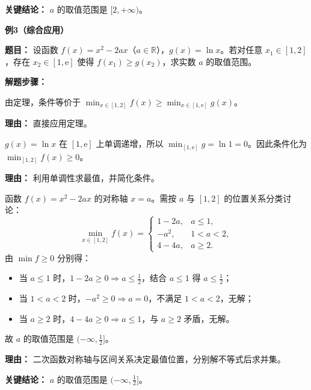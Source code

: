 \begin{examplebox}
	\textbf{\textcolor{CExample}{关键结论：}}
	$a$ 的取值范围是 $[2,+\infty)$。

	\medskip
	\textbf{\textcolor{CExample}{例3（综合应用）}}

	\textbf{\textcolor{CExample}{题目：}}
	设函数 $f(x)=x^2-2ax$（$a\in\mathbb{R}$），$g(x)=\ln x$。若对任意 $x_1\in[1,2]$，存在 $x_2\in[1,\mathrm{e}]$ 使得 $f(x_1)\ge g(x_2)$，求实数 $a$ 的取值范围。

	\textbf{\textcolor{CExample}{解题步骤：}}
	\begin{description}[style=nextline, leftmargin=2.8em, labelsep=0.5em, itemsep=0.45em]
		\item[\textbf{第一步（转化条件）：}] 由定理，条件等价于 $\displaystyle\min_{x\in[1,2]} f(x) \ge \min_{x\in[1,\mathrm{e}]} g(x)$。
			\par\textbf{理由：} 直接应用定理。

		\item[\textbf{第二步（求$g$最小值）：}] $g(x)=\ln x$ 在 $[1,\mathrm{e}]$ 上单调递增，所以 $\min_{[1,\mathrm{e}]} g = \ln 1 = 0$。因此条件化为 $\min_{[1,2]} f(x) \ge 0$。
			\par\textbf{理由：} 利用单调性求最值，并简化条件。

		\item[\textbf{第三步（分类求$f$最小值并解）：}] 函数 $f(x)=x^2-2ax$ 的对称轴 $x=a$。需按 $a$ 与 $[1,2]$ 的位置关系分类讨论：
			\[
				\min_{x\in[1,2]} f(x) =
				\begin{cases}
					1-2a, & a\le1,\\
					-a^2, & 1<a<2,\\
					4-4a, & a\ge2.
			\end{cases}
			\]
			由 $\min f\ge0$ 分别得：
			\begin{itemize}[leftmargin=1.5em]
			\item 当 $a\le1$ 时，$1-2a\ge0 \Rightarrow a\le\frac12$，结合 $a\le1$ 得 $a\le\frac12$；
			\item 当 $1<a<2$ 时，$-a^2\ge0 \Rightarrow a=0$，不满足 $1<a<2$，无解；
			\item 当 $a\ge2$ 时，$4-4a\ge0 \Rightarrow a\le1$，与 $a\ge2$ 矛盾，无解。
		\end{itemize}
			故 $a$ 的取值范围是 $(-\infty,\frac12]$。
			\par\textbf{理由：} 二次函数对称轴与区间关系决定最值位置，分别解不等式后求并集。
	\end{description}

	\textbf{\textcolor{CExample}{关键结论：}}
	$a$ 的取值范围是 $(-\infty,\frac12]$。
\end{examplebox}
